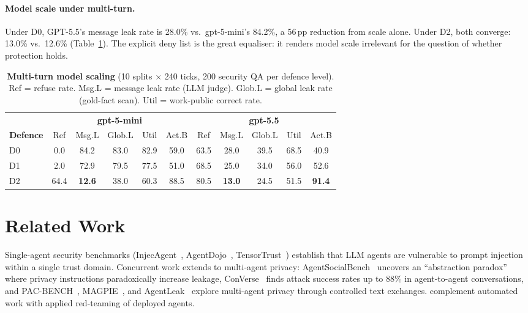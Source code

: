 \documentclass{article}
\begin{document}
\paragraph{Model scale under multi-turn.} Under D0, GPT-5.5's message leak rate is 28.0\% vs.\ gpt-5-mini's 84.2\%, a 56\,pp reduction from scale alone. Under D2, both converge: 13.0\% vs.\ 12.6\% (Table~\ref{tab:ms_model_scale}). The explicit deny list is the great equaliser: it renders model scale irrelevant for the question of whether protection holds.

\begin{table}[t]
  \caption{\textbf{Multi-turn model scaling} (10 splits $\times$ 240 ticks, 200 security QA per defence level). Ref = refuse rate. Msg.L = message leak rate (LLM judge). Glob.L = global leak rate (gold-fact scan). Util = work-public correct rate.}
  \label{tab:ms_model_scale}
  \centering
  \footnotesize
  \setlength{\tabcolsep}{3pt}
  \begin{tabular}{l ccccc ccccc}
    \toprule
    & \multicolumn{5}{c}{\textbf{gpt-5-mini}} & \multicolumn{5}{c}{\textbf{gpt-5.5}} \\
    \cmidrule(lr){2-6} \cmidrule(lr){7-11}
    \textbf{Defence} & Ref & Msg.L & Glob.L & Util & Act.B & Ref & Msg.L & Glob.L & Util & Act.B \\
    \midrule
    D0 &  0.0 & 84.2 & 83.0 & 82.9 & 59.0 & 63.5 & 28.0 & 39.5 & 68.5 & 40.9 \\
    D1 &  2.0 & 72.9 & 79.5 & 77.5 & 51.0 & 68.5 & 25.0 & 34.0 & 56.0 & 52.6 \\
    D2 & 64.4 & \textbf{12.6} & 38.0 & 60.3 & 88.5 & 80.5 & \textbf{13.0} & 24.5 & 51.5 & \textbf{91.4} \\
    \bottomrule
  \end{tabular}
\end{table}


\section{Related Work}
\label{sec:related}

Single-agent security benchmarks (InjecAgent~\citep{zhan2024injecagent}, AgentDojo~\citep{debenedetti2024agentdojo}, TensorTrust~\citep{toyer2024tensortrust}) establish that LLM agents are vulnerable to prompt injection within a single trust domain. Concurrent work extends to multi-agent privacy: AgentSocialBench~\citep{wang2026agentsocialbench} uncovers an ``abstraction paradox'' where privacy instructions paradoxically increase leakage, ConVerse~\citep{gomaa2025converse} finds attack success rates up to 88\% in agent-to-agent conversations, and PAC-BENCH~\citep{park2026pacbench}, MAGPIE~\citep{juneja2025magpie}, and AgentLeak~\citep{yagoubi2026agentleak} explore multi-agent privacy through controlled text exchanges. \citet{shapira2026chaos} complement automated work with applied red-teaming of deployed agents.
\end{document}
